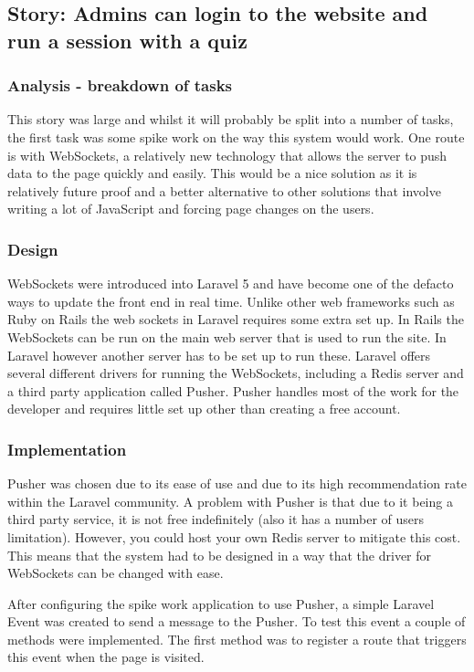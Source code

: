 \subsection{Story: Admins can login to the website and run a session with a quiz}
\subsubsection{Analysis - breakdown of tasks}
This story was large and whilst it will probably be split into a number of tasks, the first task was some spike work on the way this system would work. One route is with WebSockets, a relatively new technology that allows the server to push data to the page quickly and easily\cite{websockets}. This would be a nice solution as it is relatively future proof and a better alternative to other solutions that involve writing a lot of JavaScript and forcing page changes on the users.
\subsubsection{Design}
WebSockets were introduced into Laravel 5 and have become one of the defacto ways to update the front end in real time. Unlike other web frameworks such as Ruby on Rails the web sockets in Laravel requires some extra set up. In Rails the WebSockets can be run on the main web server that is used to run the site\cite{rails-websockets}. In Laravel however another server has to be set up to run these. Laravel offers several different drivers for running the WebSockets, including a Redis server and a third party application called Pusher\cite{laravel-broadcasting}. Pusher handles most of the work for the developer and requires little set up other than creating a free account\cite{pusher-what-is}.
\subsubsection{Implementation}
Pusher was chosen due to its ease of use and due to its high recommendation rate within the Laravel community. A problem with Pusher is that due to it being a third party service, it is not free indefinitely (also it has a number of users limitation). However, you could host your own Redis server to mitigate this cost. This means that the system had to be designed in a way that the driver for WebSockets can be changed with ease.

After configuring the spike work application to use Pusher, a simple Laravel Event was created to send a message to the Pusher. To test this event a couple of methods were implemented. The first method was to register a route that triggers this event when the page is visited.
 
